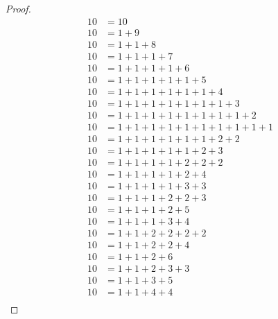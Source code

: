 \begin{proof}
    \begin{align*}
        10 & = 10                                              \\
        10 & = 1 + 9                                           \\
        10 & = 1 + 1 + 8                                       \\
        10 & = 1 + 1 + 1 + 7                                   \\
        10 & = 1 + 1 + 1 + 1 + 6                               \\
        10 & = 1 + 1 + 1 + 1 + 1 + 5                           \\
        10 & = 1 + 1 + 1 + 1 + 1 + 1 + 4                       \\
        10 & = 1 + 1 + 1 + 1 + 1 + 1 + 1 + 3                   \\
        10 & = 1 + 1 + 1 + 1 + 1 + 1 + 1 + 1 + 2               \\
        10 & = 1 + 1 + 1 + 1 + 1 + 1 + 1 + 1 + 1 + 1           \\
        10 & = 1 + 1 + 1 + 1 + 1 + 1 + 2 + 2                   \\
        10 & = 1 + 1 + 1 + 1 + 1 + 2 + 3                       \\
        10 & = 1 + 1 + 1 + 1 + 2 + 2 + 2                       \\
        10 & = 1 + 1 + 1 + 1 + 2 + 4                           \\
        10 & = 1 + 1 + 1 + 1 + 3 + 3                           \\
        10 & = 1 + 1 + 1 + 2 + 2 + 3                           \\
        10 & = 1 + 1 + 1 + 2 + 5                               \\
        10 & = 1 + 1 + 1 + 3 + 4                               \\
        10 & = 1 + 1 + 2 + 2 + 2 + 2                           \\
        10 & = 1 + 1 + 2 + 2 + 4                               \\
        10 & = 1 + 1 + 2 + 6                                   \\
        10 & = 1 + 1 + 2 + 3 + 3                               \\
        10 & = 1 + 1 + 3 + 5                                   \\
        10 & = 1 + 1 + 4 + 4                                   \\

\end{align*}
\end{proof}
